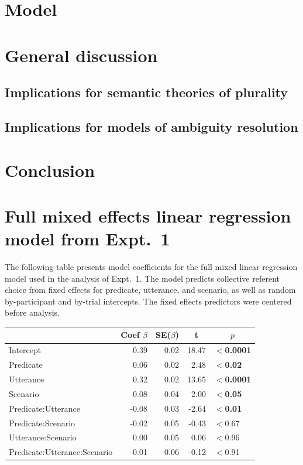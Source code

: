 \documentclass[linguex]{sp}
\begin{document}
\section{Model}


\section{General discussion}


\subsection{Implications for semantic theories of plurality}


\subsection{Implications for models of ambiguity resolution}


\section{Conclusion}


\appendix
\section{Full mixed effects linear regression model from Expt.~1}\label{expt1results}


The following table presents model coefficients for the full mixed linear regression model used in the analysis of Expt.~1. The model predicts collective referent choice from fixed effects for predicate, utterance, and scenario, as well as random by-participant and by-trial intercepts. The fixed effects predictors were centered before analysis.

\begin{center}

\begin{tabular}{lrrrl}\toprule
	&	Coef $\beta$	&	SE($\beta$)	&	\multicolumn{1}{c}{ \textbf{t}}	&	\multicolumn{1}{c}{$p$}\\ \midrule
Intercept	&	0.39	&	0.02	&	18.47	&	\textbf{$<$0.0001}\\
Predicate	&	0.06	&	0.02	&	2.48	&	\textbf{$<$0.02}\\
Utterance	&	0.32	&	0.02	&	13.65	&	\textbf{$<$0.0001}\\
Scenario	&	0.08	&	0.04	&	2.00	&	\textbf{$<$0.05}\\
Predicate:Utterance	&	-0.08	&	0.03	&	-2.64	&	\textbf{$<$0.01}\\
Predicate:Scenario	&	-0.02	&	0.05	&	-0.43	&	$<$0.67\\
Utterance:Scenario	&	0.00	&	0.05	&	0.06	&	$<$0.96\\
Predicate:Utterance:Scenario	&	-0.01	&	0.06	&	-0.12	&	$<$0.91\\
\bottomrule
\end{tabular}

\end{center}
 
\end{document}
